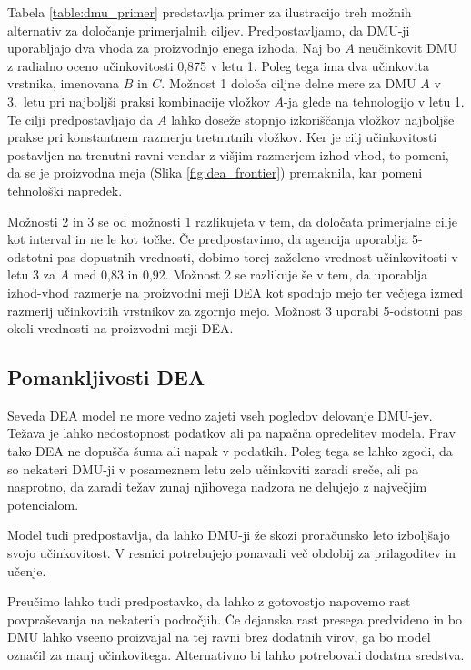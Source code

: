 \documentclass[12pt,a4paper]{article}
\theoremstyle{definition}
\begin{document}
Tabela \ref{table:dmu_primer} predstavlja primer za ilustracijo
treh možnih alternativ za določanje primerjalnih
ciljev. Predpostavljamo, da DMU-ji uporabljajo dva
vhoda za proizvodnjo enega izhoda. Naj bo $A$ neučinkovit
DMU z radialno oceno učinkovitosti 0{,}875 v letu 1.
Poleg tega ima dva učinkovita vrstnika, imenovana 
$B$ in $C$. Možnost 1 določa ciljne delne mere za DMU
$A$ v 3.\ letu pri najboljši praksi kombinacije vložkov
$A$-ja glede na tehnologijo v letu 1. Te cilji 
predpostavljajo da $A$ lahko doseže stopnjo
izkoriščanja vložkov najboljše prakse pri konstantnem
razmerju tretnutnih vložkov. Ker je cilj učinkovitosti
postavljen na trenutni ravni vendar z višjim razmerjem
izhod-vhod, to pomeni, da se je proizvodna meja (Slika
\ref{fig:dea_frontier}) premaknila, kar pomeni tehnološki
napredek. \cite{Yaisawarng2002}

Možnosti 2 in 3 se od možnosti 1 razlikujeta v tem, da
določata primerjalne cilje kot interval in ne le kot točke.
Če predpostavimo, da agencija uporablja 5-odstotni pas 
dopustnih vrednosti, dobimo torej zaželeno vrednost 
učinkovitosti v letu 3 za $A$ med 0{,}83 in 0{,}92.
Možnost 2 se razlikuje še v tem, da uporablja
izhod-vhod razmerje na proizvodni meji DEA kot
spodnjo mejo ter večjega izmed razmerij učinkovitih
vrstnikov za zgornjo mejo. Možnost 3 uporabi 5-odstotni
pas okoli vrednosti na proizvodni meji DEA. 
\cite{Yaisawarng2002}

\subsection{Pomankljivosti DEA}

Seveda DEA model ne more vedno zajeti vseh pogledov
delovanje DMU-jev. Težava je lahko nedostopnost
podatkov ali pa napačna opredelitev modela.
Prav tako DEA ne dopušča šuma ali napak v podatkih.
Poleg tega se lahko zgodi, da so nekateri DMU-ji v
posameznem letu zelo učinkoviti zaradi sreče, ali pa
nasprotno, da zaradi težav zunaj njihovega nadzora
ne delujejo z največjim potencialom.

Model tudi predpostavlja, da lahko DMU-ji že skozi
proračunsko leto izboljšajo svojo učinkovitost. V
resnici potrebujejo ponavadi več obdobij za prilagoditev
in učenje. 

Preučimo lahko tudi predpostavko, da lahko z gotovostjo
napovemo rast povpraševanja na nekaterih področjih. Če
dejanska rast presega predvideno in bo DMU lahko vseeno
proizvajal na tej ravni brez dodatnih virov, ga bo
model označil za manj učinkovitega. Alternativno bi
lahko potrebovali dodatna sredstva.
\end{document}
